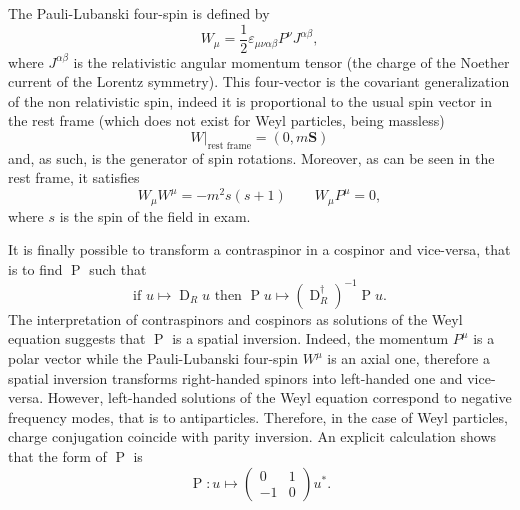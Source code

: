 The Pauli-Lubanski four-spin is defined by
\begin{equation}
  W_\mu = \frac{1}{2} \varepsilon_{\mu \nu \alpha \beta} P^\nu J^{\alpha \beta} , 
\end{equation}
where $J^{\alpha \beta}$ is the relativistic angular momentum tensor (the charge of the Noether current of the Lorentz symmetry). This four-vector is the covariant generalization of the non relativistic spin, indeed it is proportional to the usual spin vector in the rest frame (which does not exist for Weyl particles, being massless)
\begin{equation}
  \left. W \right\vert_\text{rest frame} = \left( 0 , m \symbf{S} \right) 
\end{equation}
and, as such, is the generator of spin rotations. Moreover, as can be seen in the rest frame, it satisfies
\begin{equation}
  W_\mu W^\mu = - m^2 s ( s + 1 ) \qquad W_\mu P^\mu = 0 ,
\end{equation}
where $s$ is the spin of the field in exam. 

It is finally possible to transform a contraspinor in a cospinor and vice-versa, that is to find $\operatorname{P}$ such that
\begin{equation}
  \text{if } u \mapsto \operatorname{D}_Ru \text{ then } \operatorname{P} u \mapsto \left( \operatorname{D}^\dagger_R \right)^{-1} \operatorname{P} u .
\end{equation}
The interpretation of contraspinors and cospinors as solutions of the Weyl equation suggests that $\operatorname{P}$ is a spatial inversion. Indeed, the momentum $P^\mu$ is a polar vector while the Pauli-Lubanski four-spin $W^\mu$ is an axial one, therefore a spatial inversion transforms right-handed spinors into left-handed one and vice-versa. However, left-handed solutions of the Weyl equation correspond to negative frequency modes, that is to antiparticles. Therefore, in the case of Weyl particles, charge conjugation coincide with parity inversion. An explicit calculation shows that the form of $\operatorname{P}$ is
\begin{equation}
  \operatorname{P} \colon u \mapsto \begin{pmatrix} 0 & 1 \\ -1 & 0 \end{pmatrix} u^* .
\end{equation}

